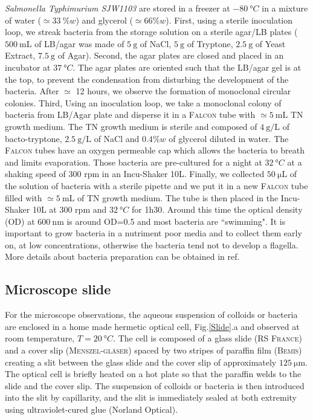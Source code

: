 \documentclass[prb,reprint,amsmath,amssymb]{revtex4-1}
\newcommand{\tg}[1]{{\color{magenta}#1}} %
\begin{document}
\textit{Salmonella Typhimurium SJW1103}  are stored in a freezer at $\SI{-80}{\degree C}$ in a mixture of water ($\simeq \SI{33}{\%} w$) and glycerol ($\simeq 66\% w$). First, using a sterile inoculation loop, we streak bacteria from the storage solution on a sterile agar/LB plates  ($\SI{500}{\milli\liter}$ of LB/agar was made of $\SI{5}{\gram}$ of NaCl, $\SI{5}{\gram}$ of Tryptone, $\SI{2.5}{\gram}$ of Yeast Extract, $\SI{7.5}{\gram}$ of Agar). Second, the agar plates are closed and placed in an incubator at $\SI{37}{\degree C}$. The agar plates are oriented such that the LB/agar gel is at the top, to prevent the condensation from disturbing the development of the bacteria. After $\simeq$ 12 hours, we observe the formation of monoclonal circular colonies. Third, Using an inoculation loop, we take a monoclonal colony of bacteria from LB/Agar plate and disperse it in a \textsc{Falcon} tube with $\simeq \SI{5}{\milli\liter}$ TN growth medium. The TN growth medium is sterile and composed of $\SI{4}{\gram\per\liter}$ of bacto-tryptone, $\SI{2.5}{\gram\per\liter}$ of NaCl and $0.4\% w$ of glycerol diluted in water. The \textsc{Falcon} tubes have an oxygen permeable cap which allows the bacteria to breath and limits evaporation. Those bacteria are pre-cultured for a night at $\SI{32}{\degree C}$ \tg{at a shaking speed of} 300 rpm in an Incu-Shaker 10L. Finally, we collected $\SI{50}{\micro\liter}$ of the solution of bacteria with a sterile pipette and we put it in a new \textsc{Falcon} tube filled with $\simeq \SI{5}{\milli\liter}$ of TN growth medium. The tube is then placed in the Incu-Shaker 10L at 300 rpm and $\SI{32}{\degree C}$ for 1h30. Around this time the optical density (OD) at $\SI{600}{\nano\meter}$ is around OD=0.5 and most bacteria are ``swimming". It is important to grow bacteria in a nutriment poor media and to collect them early on, at low concentrations, otherwise the bacteria tend not to develop a flagella. More details about bacteria preparation can be obtained in ref\cite{Schwarz2015, ajp2010hagen, XXX}.

\subsection{Microscope slide}
For the microscope observations, the aqueous suspension of colloids or bacteria are enclosed in a home made hermetic optical cell, Fig.\ref{Slide}.a and observed at room temperature, $T=\SI{20}{\degree C}$. The cell is composed of a  glass slide (\textsc{RS France}) and a cover slip (\textsc{Menszel-gl\"aser}) spaced by two stripes of paraffin film (\textsc{Bemis}) \tg{creating a slit between the glass slide and the cover slip of approximately $\SI{125}{\micro\meter}$}. The optical cell is briefly heated on a hot plate so that the paraffin welds to the slide and the cover slip. The suspension of colloids or bacteria is then introduced into the slit by capillarity, and the slit is immediately sealed at both extremity using ultraviolet-cured glue (Norland Optical).
\end{document}
